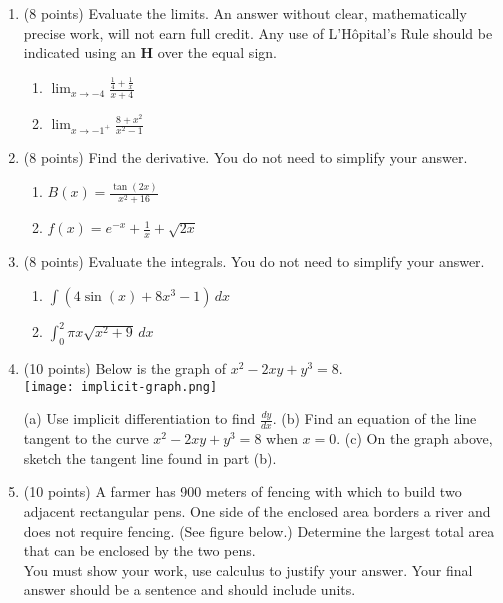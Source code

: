 \documentclass[12pt]{article}
\begin{document}
\newpage
\begin{enumerate}
\item (8 points) Evaluate the limits. An answer without clear, mathematically precise work, will not earn full credit. Any use of L'H\^{o}pital's Rule should be indicated using an \textbf{H} over the equal sign.
	\begin{enumerate}
	\item $\displaystyle \lim_{x \to -4} \frac{\frac{1}{4}+\frac{1}{x}}{x+4}$
	\vfill
	\item $\displaystyle \lim_{x \to -1^+} \frac{8+x^2}{x^2-1}$
	\vfill
	\end{enumerate}
\newpage
\item (8 points) Find the derivative. You do not need to simplify your answer.
	\begin{enumerate}
	\item $\displaystyle B(x)=\frac{\tan(2x)}{{x^2+16}}$
	\vfill
	\item $\displaystyle f(x)=e^{-x}+\frac{1}{x}+\sqrt{2x}$
	\vfill
	\end{enumerate}
\item (8 points) Evaluate the integrals. You do not need to simplify your answer.
\begin{enumerate}
	\item $\displaystyle \int (4\sin(x)+8x^3-1)\, dx$
	\vfill
	\item $\displaystyle \int_0^2 \pi x \sqrt{x^2+9} \, dx $
	\vfill
	\end{enumerate}
\newpage
\item (10 points) Below is the graph of $x^2-2xy+y^3=8.$\\
\texttt{[image: implicit-graph.png]}

(a) Use implicit differentiation to find $\displaystyle \frac{dy}{dx}.$
\vfill
(b) Find an equation of the line tangent to the curve $x^2-2xy+y^3=8$ when $x=0.$
\vfill
(c)  On the graph above, sketch the tangent line found in part (b).
\vspace{.5in}
\newpage
\item (10 points) A farmer has 900 meters of fencing with which to build two adjacent rectangular pens. One side of the enclosed area borders a river and does not require fencing. (See figure below.) Determine the largest total area that can be enclosed by the two pens.\\
You must show your work, use calculus to justify your answer. Your final answer should be a sentence and should include units.\\


\end{enumerate}
\end{document}
